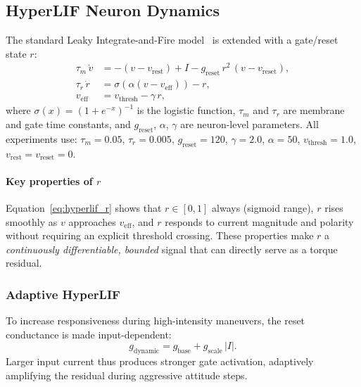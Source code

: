 \documentclass[conference]{IEEEtran}
\begin{document}
\subsection{HyperLIF Neuron Dynamics}
\label{sec:hyperlif_dynamics}

The standard Leaky Integrate-and-Fire model~\cite{maass1997lsm} is extended
with a gate/reset state $r$:
\begin{align}
  \tau_m\,\dot{v} &= -(v - v_{\mathrm{rest}}) + I
                     - g_{\mathrm{reset}}\,r^2\,(v - v_{\mathrm{reset}}),
  \label{eq:hyperlif_v}\\
  \tau_r\,\dot{r} &= \sigma\!\left(\alpha(v - v_{\mathrm{eff}})\right) - r,
  \label{eq:hyperlif_r}\\
  v_{\mathrm{eff}} &= v_{\mathrm{thresh}} - \gamma\,r,
  \label{eq:hyperlif_veff}
\end{align}
where $\sigma(x)=(1+e^{-x})^{-1}$ is the logistic function,
$\tau_m$ and $\tau_r$ are membrane and gate time constants,
and $g_{\mathrm{reset}}$, $\alpha$, $\gamma$ are neuron-level parameters.
All experiments use: $\tau_m{=}0.05$, $\tau_r{=}0.005$,
$g_{\mathrm{reset}}{=}120$, $\gamma{=}2.0$, $\alpha{=}50$,
$v_{\mathrm{thresh}}{=}1.0$, $v_{\mathrm{rest}}{=}v_{\mathrm{reset}}{=}0$.

\paragraph{Key properties of $r$}
Equation~\eqref{eq:hyperlif_r} shows that $r \in [0,1]$ always (sigmoid range),
$r$ rises smoothly as $v$ approaches $v_{\mathrm{eff}}$, and $r$ responds to
current magnitude and polarity without requiring an explicit threshold crossing.
These properties make $r$ a \emph{continuously differentiable, bounded} signal
that can directly serve as a torque residual.

\subsubsection{Adaptive HyperLIF}

To increase responsiveness during high-intensity maneuvers, the reset
conductance is made input-dependent:
\begin{equation}
  g_{\mathrm{dynamic}} = g_{\mathrm{base}} + g_{\mathrm{scale}}\,|I|.
  \label{eq:adaptive_g}
\end{equation}
Larger input current thus produces stronger gate activation, adaptively
amplifying the residual during aggressive attitude steps.
\end{document}

